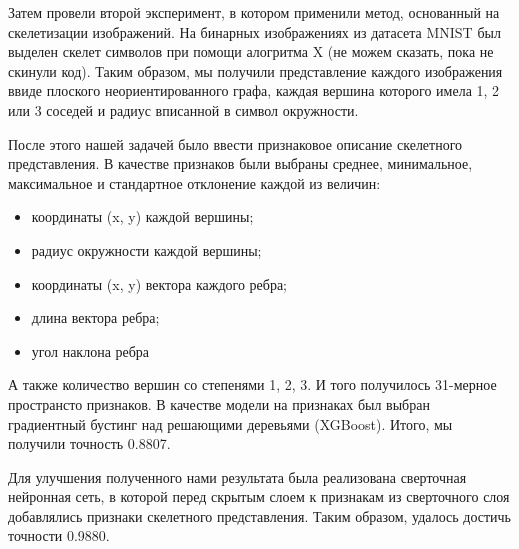 \documentclass{llncs}
\begin{document}
Затем провели второй эксперимент, в котором применили метод, основанный на скелетизации изображений. На бинарных изображениях из датасета MNIST был выделен скелет символов при помощи алогритма X (не можем сказать, пока не скинули код). Таким образом, мы получили представление каждого изображения ввиде плоского неориентированного графа, каждая вершина которого имела 1, 2 или 3 соседей и радиус вписанной в символ окружности.

После этого нашей задачей было ввести признаковое описание скелетного представления. В качестве признаков были выбраны среднее, минимальное, максимальное и стандартное отклонение каждой из величин:
\begin{itemize}
\item координаты (x, y) каждой вершины;
\item радиус окружности каждой вершины;
\item координаты (x, y) вектора каждого ребра;
\item длина вектора ребра;
\item угол наклона ребра
\end{itemize}
А также количество вершин со степенями 1, 2, 3. И того получилось 31-мерное пространсто признаков. В качестве модели на признаках был выбран градиентный бустинг над решающими деревьями (XGBoost). Итого, мы получили точность 0.8807.

Для улучшения полученного нами результата была реализована сверточная нейронная сеть, в которой перед скрытым слоем к признакам из сверточного слоя добавлялись признаки скелетного представления. Таким образом, удалось достичь точности 0.9880.



\end{document}
